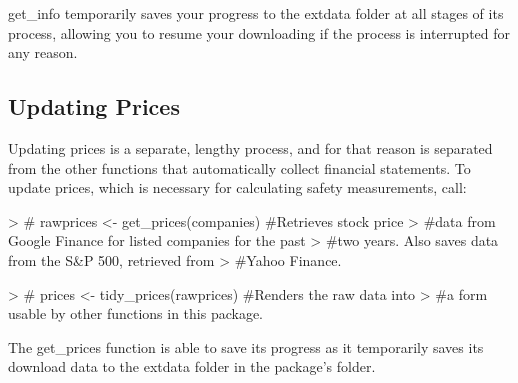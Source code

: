 \documentclass[titlepage]{article}
\begin{document}
get\_info temporarily saves your progress to the extdata folder at all stages of its process, allowing you to resume your downloading if the process is interrupted for any reason.

\subsection*{Updating Prices}
Updating prices is a separate, lengthy process, and for that reason is separated from the other functions that automatically collect financial statements. To update prices, which is necessary for calculating safety measurements, call:

\begin{Schunk}
\begin{Sinput}
> # rawprices <- get_prices(companies) #Retrieves stock price 
> #data from Google Finance for listed companies for the past 
> #two years. Also saves data from the S&P 500, retrieved from 
> #Yahoo Finance.
\end{Sinput}
\end{Schunk}
\begin{Schunk}
\begin{Sinput}
> # prices <- tidy_prices(rawprices) #Renders the raw data into 
> #a form usable by other functions in this package.
\end{Sinput}
\end{Schunk}

The get\_prices function is able to save its progress as it temporarily saves its download data to the extdata folder in the package's folder.
\end{document}
